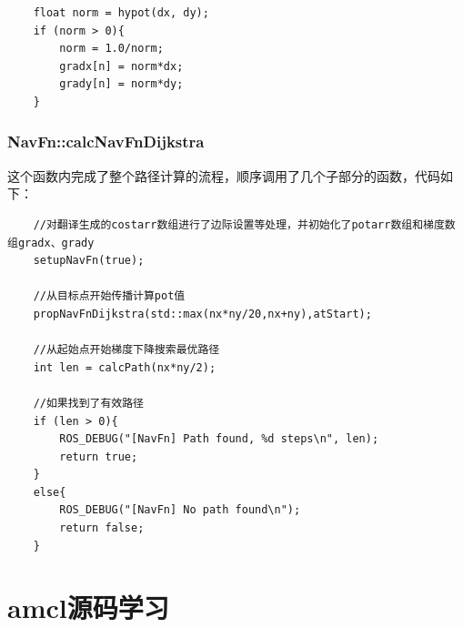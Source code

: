 \documentclass[9pt, oneside]{book}
\begin{document}
\small
\begin{verbatim}
    float norm = hypot(dx, dy);
    if (norm > 0){
        norm = 1.0/norm;
        gradx[n] = norm*dx;
        grady[n] = norm*dy;
    }
\end{verbatim}
\normalsize

\subsubsection{NavFn::calcNavFnDijkstra}

这个函数内完成了整个路径计算的流程，顺序调用了几个子部分的函数，代码如下：

\small
\begin{verbatim}
    //对翻译生成的costarr数组进行了边际设置等处理，并初始化了potarr数组和梯度数组gradx、grady
    setupNavFn(true);

    //从目标点开始传播计算pot值
    propNavFnDijkstra(std::max(nx*ny/20,nx+ny),atStart);

    //从起始点开始梯度下降搜索最优路径
    int len = calcPath(nx*ny/2);

    //如果找到了有效路径
    if (len > 0){
        ROS_DEBUG("[NavFn] Path found, %d steps\n", len);
        return true;
    }
    else{
        ROS_DEBUG("[NavFn] No path found\n");
        return false;
    }
\end{verbatim}
\normalsize
















\section{amcl源码学习}
\end{document}
